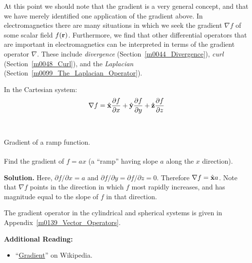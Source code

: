 At this point we should note that the gradient is a very general concept, and that we have merely identified one application of the gradient above.  In electromagnetics there are many situations in which we seek the gradient $\nabla f$ of some scalar field $f({\bf r})$.  Furthermore, we find that other differential operators that are important in electromagnetics can be interpreted in terms of the gradient operator $\nabla$.  These include
\emph{divergence} (Section~\ref{m0044_Divergence}), 
\emph{curl} (Section~\ref{m0048_Curl}), 
and the \emph{Laplacian} (Section~\ref{m0099_The_Laplacian_Operator}).

In the Cartesian system:
%
\begin{equation}
\nabla f = \hat{\bf x}\frac{\partial f}{\partial x} + \hat{\bf y}\frac{\partial f}{\partial y} + \hat{\bf z}\frac{\partial f}{\partial z} 
\label{eDelCar}
\end{equation}

~\\ \begin{example} 
\begin{mdframed}[backgroundcolor=brown!20,linecolor=brown!20]\raggedright
Gradient of a ramp function.
\\~\\
Find the gradient of $f=ax$ (a ``ramp'' having slope $a$ along the $x$ direction).

{\bf Solution.} 
Here, $\partial f/\partial x = a$ and $\partial f/\partial y = \partial f/\partial z = 0$.  Therefore
$\nabla f = \hat{\bf x}a$.
Note that $\nabla f$ points in the direction in which $f$ most rapidly increases, and has magnitude equal to the slope of $f$ in that direction.
\end{mdframed}\end{example}

The gradient operator in the cylindrical and spherical systems is given in Appendix~\ref{m0139_Vector_Operators}. 


{\bf Additional Reading:}
\begin{itemize}
\item ``\href{https://en.wikipedia.org/wiki/Gradient}{Gradient}'' on Wikipedia.
\end{itemize}

